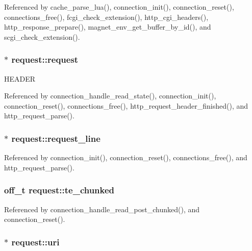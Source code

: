 Referenced by cache\-\_\-parse\-\_\-lua(), connection\-\_\-init(), connection\-\_\-reset(), connections\-\_\-free(), fcgi\-\_\-check\-\_\-extension(), http\-\_\-cgi\-\_\-headers(), http\-\_\-response\-\_\-prepare(), magnet\-\_\-env\-\_\-get\-\_\-buffer\-\_\-by\-\_\-id(), and scgi\-\_\-check\-\_\-extension().

\hypertarget{structrequest_a942d303fc2a108f6de48f61ed9220c78}{
\subsubsection[{request}]{$\ast$ request\-::request}}\label{structrequest_a942d303fc2a108f6de48f61ed9220c78}
H\-E\-A\-D\-E\-R 

Referenced by connection\-\_\-handle\-\_\-read\-\_\-state(), connection\-\_\-init(), connection\-\_\-reset(), connections\-\_\-free(), http\-\_\-request\-\_\-header\-\_\-finished(), and http\-\_\-request\-\_\-parse().

\hypertarget{structrequest_a05bf671b3cc2d2e53f342cb442373a0b}{
\subsubsection[{request\-\_\-line}]{$\ast$ request\-::request\-\_\-line}}\label{structrequest_a05bf671b3cc2d2e53f342cb442373a0b}


Referenced by connection\-\_\-init(), connection\-\_\-reset(), connections\-\_\-free(), and http\-\_\-request\-\_\-parse().

\hypertarget{structrequest_a3c6ebab245d7677842e644976fe8c392}{
\subsubsection[{te\-\_\-chunked}]{\setlength{\rightskip}{0pt plus 5cm}off\-\_\-t request\-::te\-\_\-chunked}}\label{structrequest_a3c6ebab245d7677842e644976fe8c392}


Referenced by connection\-\_\-handle\-\_\-read\-\_\-post\-\_\-chunked(), and connection\-\_\-reset().

\hypertarget{structrequest_aef1dc716db5d4c8e7a6f9bbe97951ed9}{
\subsubsection[{uri}]{$\ast$ request\-::uri}}\label{structrequest_aef1dc716db5d4c8e7a6f9bbe97951ed9}


